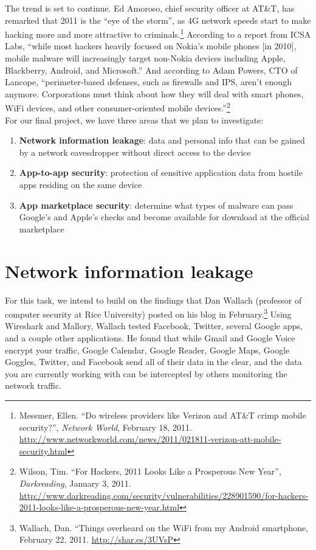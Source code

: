 \documentclass[11pt]{article}
\begin{document}
The trend is set to continue. Ed Amoroso, chief security officer at AT\&T, has remarked that 2011 is the ``eye of the storm'', as 4G network speeds start to make hacking more and more attractive to criminals.\footnote{Messmer, Ellen. ``Do wireless providers like Verizon and AT\&T crimp mobile security?'', \textit{Network World}, February 18, 2011. \url{http://www.networkworld.com/news/2011/021811-verizon-att-mobile-security.html}} According to a report from ICSA Labs, ``while most hackers heavily focused on Nokia's mobile phones [in 2010], mobile malware will increasingly target non-Nokia devices including Apple, Blackberry, Android, and Microsoft.'' And according to Adam Powers, CTO of Lancope, ``perimeter-based defenses, such as firewalls and IPS, aren't enough anymore. Corporations must think about how they will deal with smart phones, WiFi devices, and other consumer-oriented mobile devices.''\footnote{Wilson, Tim. ``For Hackers, 2011 Looks Like a Prosperous New Year'', \textit{Darkreading}, January 3, 2011. \url{http://www.darkreading.com/security/vulnerabilities/228901590/for-hackers-2011-looks-like-a-prosperous-new-year.html}}\\

For our final project, we have three areas that we plan to investigate:
\begin{enumerate}
\item \textbf{Network information leakage}: data and personal info that can be gained by a network eavesdropper without direct access to the device
\item \textbf{App-to-app security}: protection of sensitive application data from hostile apps residing on the same device
\item \textbf{App marketplace security}: determine what types of malware can pass Google's and Apple's checks and become available for download at the official marketplace
\end{enumerate}

\section{Network information leakage}
For this task, we intend to build on the findings that Dan Wallach (professor of computer security at Rice University) posted on his blog in February.\footnote{Wallach, Dan. ``Things overheard on the WiFi from my Android smartphone, February 22, 2011. \url{http://shar.es/3UVsP}} Using Wireshark and Mallory, Wallach tested Facebook, Twitter, several Google apps, and a couple other applications. He found that while Gmail and Google Voice encrypt your traffic, Google Calendar, Google Reader, Google Maps, Google Goggles, Twitter, and Facebook send all of their data in the clear, and the data you are currently working with can be intercepted by others monitoring the network traffic.
\end{document}
